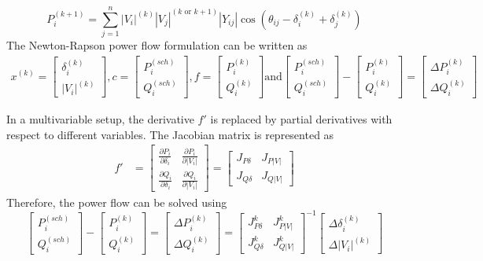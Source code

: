 \documentclass[11pt, oneside, reqno]{amsart}
\numberwithin{equation}{section}
\theoremstyle{plain}%
\theoremstyle{definition}
\theoremstyle{remark}
\begin{document}
\[	
P^{(k+1)}_i=\sum^n_{j=1}|V_i|^{(k)}|V_j|^{(k\,\,\text{or}\,\,k+1)}|Y_{ij}|\cos(\theta_{ij}-\delta^{(k)}_i+\delta^{(k)}_j)
\]
The Newton-Rapson power flow formulation can be written as
\begin{align*}
	x^{(k)}=
\begin{bmatrix}
\delta^{(k)}_i\\
|V_i|^{(k)}
\end{bmatrix}
,
c=
\begin{bmatrix}
P^{(sch)}_i\\
Q^{(sch)}_i
\end{bmatrix}
,
f=
\begin{bmatrix}
P^{(k)}_i\\
Q^{(k)}_i
\end{bmatrix}
\text{and}
\begin{bmatrix}
P^{(sch)}_i\\
Q^{(sch)}_i
\end{bmatrix}
-
\begin{bmatrix}
P^{(k)}_i\\
Q^{(k)}_i
\end{bmatrix}
=
\begin{bmatrix}
\Delta P^{(k)}_i\\
\Delta Q^{(k)}_i
\end{bmatrix}
\end{align*}


In a multivariable setup, the derivative $f'$ is replaced by partial derivatives with respect to different variables. The Jacobian matrix is represented as
\begin{align}
	f'&=
	\begin{bmatrix}
		\frac{\partial P_i}{\partial\delta_i} & \frac{\partial P_i}{\partial |V_i|}\\
		\frac{\partial Q_i}{\partial\delta_i} & \frac{\partial Q_i}{\partial |V_i|}
	\end{bmatrix}
	= 
	\begin{bmatrix}
		J_{P\delta} & J_{P|V|}\\
		J_{Q\delta} & J_{Q|V|}
	\end{bmatrix}
\end{align}
Therefore, the power flow can be solved using 
\[\begin{bmatrix}
P^{(sch)}_i\\
Q^{(sch)}_i
\end{bmatrix}
-
\begin{bmatrix}
P^{(k)}_i\\
Q^{(k)}_i
\end{bmatrix}
=
\begin{bmatrix}
\Delta P^{(k)}_i\\
\Delta Q^{(k)}_i
\end{bmatrix}
= \begin{bmatrix}
		J^k_{P\delta} & J^k_{P|V|}\\
		J^k_{Q\delta} & J^k_{Q|V|}
	\end{bmatrix}^{-1}
	\begin{bmatrix}
	\Delta \delta^{(k)}_i\\
	\Delta |V_i|^{(k)}
	\end{bmatrix}
\]
\end{document}
